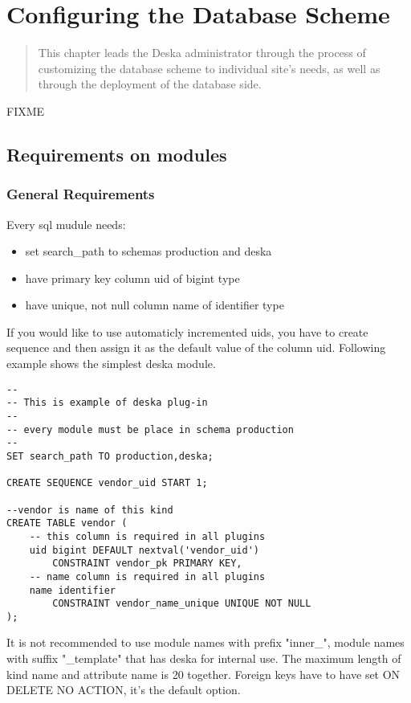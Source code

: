 \documentclass[deska]{subfiles}
\begin{document}
\chapter{Configuring the Database Scheme}
\label{sec:admin-dbscheme}

\begin{abstract}
This chapter leads the Deska administrator through the process of customizing the database scheme to individual site's
needs, as well as through the deployment of the database side.
\end{abstract}

\label{sec:db-scheme-req}
FIXME

\section{Requirements on modules}

\subsection{General Requirements}
Every sql mudule needs:

\begin{itemize}
    \item set search\_path to schemas production and deska
    \item have primary key column uid of bigint type
    \item have unique, not null column name of identifier type
\end{itemize}

If you would like to use automaticly incremented uids, you have to create sequence and then assign it as the default value of the column uid.
Following example shows the simplest deska module.

\begin{verbatim}
--
-- This is example of deska plug-in
--
-- every module must be place in schema production
--
SET search_path TO production,deska;

CREATE SEQUENCE vendor_uid START 1;

--vendor is name of this kind
CREATE TABLE vendor (
    -- this column is required in all plugins
    uid bigint DEFAULT nextval('vendor_uid')
        CONSTRAINT vendor_pk PRIMARY KEY,
    -- name column is required in all plugins
    name identifier
        CONSTRAINT vendor_name_unique UNIQUE NOT NULL
);
\end{verbatim}

It is not recommended to use module names with prefix "inner\_", module names with suffix "\_template" that has deska for internal use.
The maximum length of kind name and attribute name is 20 together.
Foreign keys have to have set ON DELETE NO ACTION, it's the default option.
\end{document}
